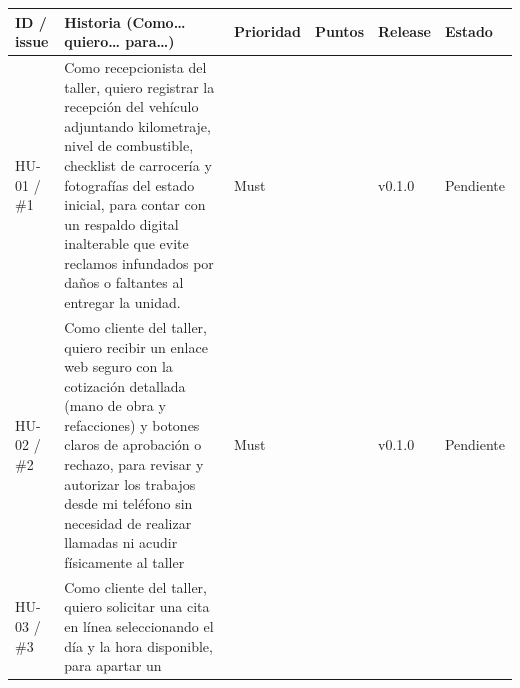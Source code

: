 {\def\LTcaptype{none} %
\begin{longtable}[]{@{}
  >{\raggedright\arraybackslash}p{}
  >{\raggedright\arraybackslash}p{}
  >{\raggedright\arraybackslash}p{}
  >{\raggedright\arraybackslash}p{}
  >{\raggedright\arraybackslash}p{}
  >{\raggedright\arraybackslash}p{}@{}}
\toprule\noalign{}
\begin{minipage}[b]{\linewidth}\raggedright
\textbf{ID / issue}
\end{minipage} & \begin{minipage}[b]{\linewidth}\raggedright
\textbf{Historia (Como\ldots{} quiero\ldots{} para\ldots)}
\end{minipage} & \begin{minipage}[b]{\linewidth}\raggedright
\textbf{Prioridad}
\end{minipage} & \begin{minipage}[b]{\linewidth}\raggedright
\textbf{Puntos}
\end{minipage} & \begin{minipage}[b]{\linewidth}\raggedright
\textbf{Release}
\end{minipage} & \begin{minipage}[b]{\linewidth}\raggedright
\textbf{Estado}
\end{minipage} \\
\midrule\noalign{}
\endhead
\bottomrule\noalign{}
\endlastfoot
HU-01 / \#1 & Como recepcionista del taller, quiero registrar la
recepción del vehículo adjuntando kilometraje, nivel de combustible,
checklist de carrocería y fotografías del estado inicial, para contar
con un respaldo digital inalterable que evite reclamos infundados por
daños o faltantes al entregar la unidad. & Must & 3 & v0.1.0 &
Pendiente \\
HU-02 / \#2 & Como cliente del taller, quiero recibir un enlace
web seguro con la cotización detallada (mano de obra y refacciones) y
botones claros de aprobación o rechazo, para revisar y autorizar los
trabajos desde mi teléfono sin necesidad de realizar llamadas ni acudir
físicamente al taller & Must & 3 & v0.1.0 & Pendiente \\
HU-03 / \#3 & Como cliente del taller, quiero solicitar una cita
en línea seleccionando el día y la hora disponible, para apartar un

\end{longtable}}
